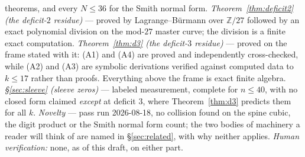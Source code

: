 \documentclass[11pt]{article}
\newcommand{\Z}{\mathbb{Z}}
\begin{document}
{theorems, and every $N \le 36$ for the Smith normal form.
\emph{Theorem~\ref{thm:deficit2} (the deficit-$2$ residue)} --- proved by
Lagrange--B\"urmann over $\Z/27$ followed by an exact polynomial division on
the mod-$27$ master curve; the division is a finite exact computation.
\emph{Theorem~\ref{thm:d3} (the deficit-$3$ residue)} --- proved on the frame
stated with it: (A1) and (A4) are proved and independently cross-checked, while
(A2) and (A3) are symbolic derivations verified against computed data to $k \le 17$
rather than proofs. Everything above the frame is exact finite algebra.
\emph{\S\ref{sec:sleeve} (sleeve zeros)} --- labeled measurement, complete for
$n \le 40$, with no closed form claimed \emph{except} at deficit $3$, where
Theorem~\ref{thm:d3} predicts them for all $k$.
\emph{Novelty} --- pass run 2026-08-18, no collision found on the spine cubic,
the digit product or the Smith normal form count; the two bodies of machinery a
reader will think of are named in \S\ref{sec:related}, with why neither applies.
\emph{Human verification:} none, as of this draft, on either part.}
\end{document}
